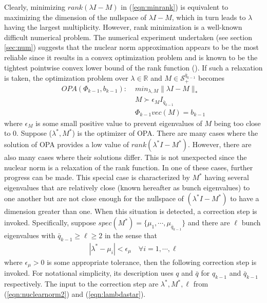\documentclass[onecolumn,reviewcopy]{autart}
\def \rrr{\color{red}}
\def \kkk{\color{black}}
\def \S{\mathcal{S}}
\begin{document}
Clearly, minimizing $rank(\lambda I -M)$ in (\ref{eqn:minrank}) is equivalent to maximizing the dimension of the nullspace of $\lambda I -M$, which in turn leads to $\lambda$ having the largest multiplicity. However, rank minimization is a well-known difficult numerical problem. The numerical experiment undertaken (see section \ref{sec:num}) suggests that the nuclear norm approximation appears to be the most reliable since it results in a convex optimization problem and is known to be the tightest pointwise convex lower bound of the rank function (\cite{ART:RFP10}).  If such a relaxation is taken, the optimization problem over $\lambda \in \mathbb{R}$ and $M \in \S^{\bar{q}_{k-1}}_{+}$ becomes
\begin{subequations}\label{eqn:nuclearnorm2}
\begin{align}
OPA(\Phi_{k-1}, b_{k-1}): \; &min_{\lambda, M} \|\lambda I - M\|_* \label{eqn:minnuclear2}\\
&M \succ \epsilon_M I_{\bar{q}_{k-1}} \label{eqn:Mepsilon2}\\
&\Phi_{k-1} vec(M) = b_{k-1} \label{eqn:Phi2}
\end{align}
\end{subequations}
where $\epsilon_M$ is some small positive value to prevent eigenvalues of $M$ being too close to $0$. Suppose ($\lambda^* , M^*$) is the optimizer of OPA. There are many cases where the solution of OPA provides a low value of $rank(\lambda^* I -M^*)$. However, there are also many cases where their solutions differ.  This is not unexpected since the nuclear norm is a relaxation of the rank function. In one of these cases, further progress can be made. This special case is characterized by $M^*$ having several eigenvalues that are relatively close (known hereafter as bunch eigenvalues) to one another but are not close enough for
the nullspace of $(\lambda^* I - M^*)$ to have a dimension greater than one. When this situation is detected, a correction step is invoked. Specifically, suppose $spec(M^*)=\{\mu_1,\cdots, \mu_{\bar{q}_{k-1}}\}$ and there are $\ell$ bunch eigenvalues with $\bar{q}_{k-1} \ge \ell \ge 2$ in the sense that
\begin{align}\label{eqn:lambdastar}
|\lambda^* - \mu_i| < \epsilon_\mu \quad \forall i =1,\cdots, \ell
\end{align}
where $\epsilon_\mu >0$ is some appropriate tolerance, then the following correction step is invoked. For notational simplicity, its description uses $q$ and $\bar{q}$ for $q_{k-1}$ and $\bar{q}_{k-1}$ respectively. The input to the correction step are $\lambda^*, M^*,\ell$ from (\ref{eqn:nuclearnorm2}) and (\ref{eqn:lambdastar}).
\end{document}
